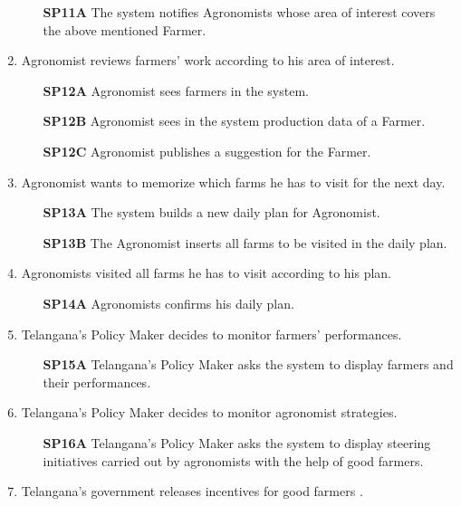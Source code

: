 \begin{enumerate}[label=\textbf{WP\arabic*}]
				\begin{enumerate}
					\item [\textbf{SP11A}] The system notifies Agronomists whose area of interest covers the above mentioned Farmer.
				\end{enumerate}
			\item \label{wp:WP12} Agronomist reviews farmers' work according to his area of interest.
				\begin{enumerate}
					\item [\textbf{SP12A}] Agronomist sees farmers in the system.
					\item [\textbf{SP12B}] Agronomist sees in the system production data of a Farmer.
					\item [\textbf{SP12C}] Agronomist publishes a suggestion for the Farmer.
				\end{enumerate}
			\item \label{wp:WP13} Agronomist wants to memorize which farms he has to visit for the next day.
				\begin{enumerate}
					\item [\textbf{SP13A}] The system builds a new daily plan for Agronomist.
					\item [\textbf{SP13B}] The Agronomist inserts all farms to be visited in the daily plan.
				\end{enumerate}
			\item \label{wp:WP14} Agronomists visited all farms he has to visit according to his plan.
				\begin{enumerate}
					\item [\textbf{SP14A}] Agronomists confirms his daily plan.
				\end{enumerate}
			\item \label{wp:WP15} Telangana's Policy Maker decides to monitor farmers' performances.
				\begin{enumerate}
					\item [\textbf{SP15A}] Telangana's Policy Maker asks the system to display farmers and their performances.
				\end{enumerate}
			\item \label{wp:WP16} Telangana's Policy Maker decides to monitor agronomist strategies.
				\begin{enumerate}
					\item [\textbf{SP16A}] Telangana's Policy Maker asks the system to display steering initiatives carried out by agronomists with the help of good farmers.
				\end{enumerate}
			\item \label{wp:WP17} Telangana's government releases incentives for good farmers .
		\end{enumerate}
		
